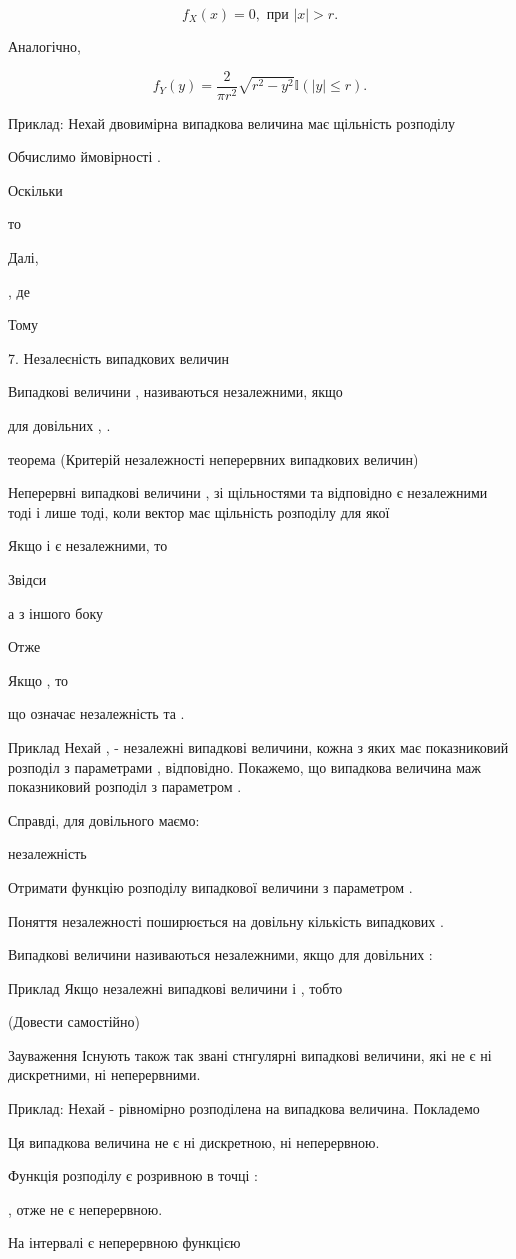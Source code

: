 $$f_X(x) = 0, \text{ при } |x| > r.$$

Аналогічно,

$$f_Y(y)
= \frac{2}{\pi r^2}\sqrt{r^2 - y^2} \mathbb{I}(|y| \leqslant r).$$

Приклад: Нехай двовимірна випадкова величина  має щільність розподілу

Обчислимо ймовірності  .

Оскільки 

то 


Далі,

, де

Тому 

7. Незалеєність випадкових величин

Випадкові величини , називаються незалежними, якщо 

для довільних , .

теорема (Критерій незалежності неперервних випадкових величин)

Неперервні випадкові величини , зі щільностями  та  відповідно є незалежними тоді 
і лише тоді, коли вектор  має щільність розподілу  для якої

Якщо  і  є незалежними, то  

Звідси 

а з іншого боку


Отже 

Якщо  , то 

що означає незалежність  та  .

Приклад 
Нехай  , - незалежні випадкові величини, кожна з яких має показниковий розподіл з параметрами  ,  
відповідно.
Покажемо, що випадкова величина   маж показниковий розподіл з параметром  .

Справді, для довільного  маємо:


незалежність

Отримати функцію розподілу випадкової величини з параметром .

Поняття незалежності поширюється на довільну кількість випадкових  .

Випадкові величини  називаються незалежними, якщо для довільних  :


Приклад Якщо  незалежні випадкові величини і  , тобто

(Довести самостійно)

Зауваження Існують також так звані стнгулярні випадкові величини, які не є ні дискретними, ні неперервними.

Приклад: Нехай  - рівномірно розподілена на  випадкова величина. Покладемо 

Ця випадкова величина не є ні дискретною, ні неперервною.

Функція розподілу  є розривною в точці :

, отже не є неперервною.

На інтервалі  є неперервною функцією









